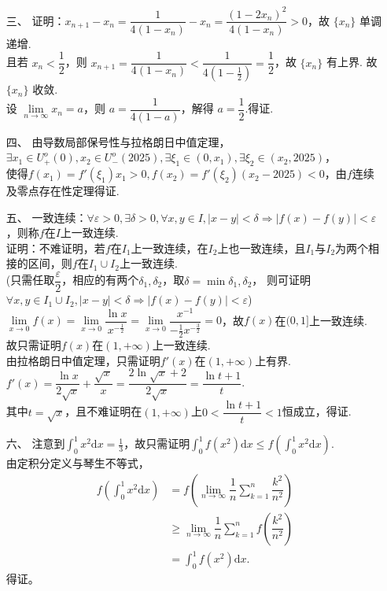 \documentclass{ctexbook}
\begin{document}
\begin{enumerate}
    \item[三、]
    证明：\(x_{n+1}-x_{n}=\dfrac{1}{4(1-x_n)}-x_n=\dfrac{(1-2x_n)^2}{4(1-x_n)}>0\)，故 \(\{x_n\}\) 单调递增.\\
    且若 \(x_n<\dfrac{1}{2}\)，则 \(x_{n+1}=\dfrac{1}{4(1-x_n)}<\dfrac{1}{4(1-\frac{1}{2})}=\dfrac{1}{2}\)，故 \(\{x_n\}\) 有上界. 故 \(\{x_n\}\) 收敛.\\
    设 \(\lim\limits_{n\to\infty}x_{n}=a\)，则 \(a=\dfrac{1}{4(1-a)}\)，解得 \(a=\dfrac{1}{2}\).得证.

    \item[四、]由导数局部保号性与拉格朗日中值定理，\\
    \(\exists x_1\in U_+^o(0),x_2\in U_-^o(2025),\exists \xi_1\in (0,x_1),\exists \xi_2\in (x_2,2025)\)，\\
    使得\(f(x_1)=f'(\xi_1)x_1>0,f(x_2)=f'(\xi_2)(x_2-2025)<0\)，由\(f\)连续及零点存在性定理得证.

    \item[五、]一致连续：\(\forall\varepsilon>0,\exists\delta>0,\forall x,y\in I,\vert x-y\vert<\delta\Rightarrow\vert f(x)-f(y)\vert<\varepsilon\)，则称\(f\)在\(I\)上一致连续.\\
    证明：不难证明，若\(f\)在\(I_1\)上一致连续，在\(I_2\)上也一致连续，且\(I_1\)与\(I_2\)为两个相接的区间，则\(f\)在\(I_1\cup I_2\)上一致连续.\\
    (只需任取\(\dfrac{\varepsilon}{2}\)，相应的有两个\(\delta_1,\delta_2\)，取\(\delta=\min{\delta_1,\delta_2}\)，
    则可证明\(\forall x,y\in I_1\cup I_2,\vert x-y\vert<\delta\Rightarrow\vert f(x)-f(y)\vert<\varepsilon\))\\
    \(\lim\limits_{x\to 0}f(x)=\lim\limits_{x\to 0}\dfrac{\ln x}{x^{-\frac{1}{2}}}=\lim\limits_{x\to 0}\dfrac{x^{-1}}{-\frac{1}{2}x^{-\frac{3}{2}}}=0\)，故\(f(x)\)在\((0,1]\)上一致连续.\\
    故只需证明\(f(x)\)在\((1,+\infty)\)上一致连续.\\
    由拉格朗日中值定理，只需证明\(f'(x)\)在\((1,+\infty)\)上有界.\\
    \(f'(x)=\dfrac{\ln x}{2\sqrt{x}}+\dfrac{\sqrt{x}}{x}=\dfrac{2\ln\sqrt{x}+2}{2\sqrt{x}}=\dfrac{\ln t+1}{t}\).\\
    其中\(t=\sqrt{x}\)，且不难证明在\((1,+\infty)\)上\(0<\dfrac{\ln t+1}{t}<1\)恒成立，得证.
    
    \item[六、]注意到\(\int_{0}^{1}x^2 \mathrm{d}x=\frac{1}{3}\)，故只需证明\(\int_{0}^{1}f(x^2) \mathrm{d}x\leq f(\int_{0}^{1}x^2 \mathrm{d}x)\).\\
    由定积分定义与琴生不等式，\\
    \begin{align*}
        f(\int_{0}^{1}x^2 \mathrm{d}x)&=f(\lim\limits_{n\to\infty}\dfrac{1}{n}\displaystyle\sum\limits_{k=1}^{n}\dfrac{k^2}{n^2})\\
        &\geq \lim\limits_{n\to\infty}\dfrac{1}{n}\displaystyle\sum\limits_{k=1}^{n}f(\dfrac{k^2}{n^2})\\
        &=\int_{0}^{1}f(x^2) \mathrm{d}x.
    \end{align*}
    得证。


\end{enumerate}
\end{document}
